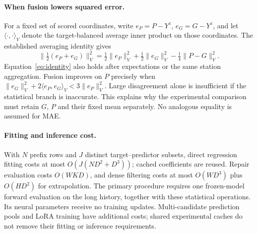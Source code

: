\paragraph{When fusion lowers squared error.}
For a fixed set of scored coordinates, write $e_P=P-Y^z$, $e_G=G-Y^z$, and let $\langle\cdot,\cdot\rangle_V$ denote the target-balanced average inner product on those coordinates. The established averaging identity gives
\begin{equation}
 \|\tfrac12(e_P+e_G)\|_V^2
 =\tfrac12\|e_P\|_V^2+\tfrac12\|e_G\|_V^2
 -\tfrac14\|P-G\|_V^2.
 \label{eq:identity}
\end{equation}
Equation~\ref{eq:identity} also holds after expectations or the same station aggregation. Fusion improves on $P$ precisely when $\|e_G\|_V^2+2\langle e_P,e_G\rangle_V<3\|e_P\|_V^2$. Large disagreement alone is insufficient if the statistical branch is inaccurate. This explains why the experimental comparison must retain $G$, $P$ and their fixed mean separately. No analogous equality is assumed for MAE.

\paragraph{Fitting and inference cost.}
With $N$ prefix rows and $J$ distinct target--predictor subsets, direct regression fitting costs at most $O(J(ND^2+D^3))$; cached coefficients are reused. Repair evaluation costs $O(WKD)$, and dense filtering costs at most $O(WD^3)$ plus $O(HD^2)$ for extrapolation. The primary procedure requires one frozen-model forward evaluation on the long history, together with these statistical operations. Its neural parameters receive no training updates. Multi-candidate prediction pools and LoRA training have additional costs; shared experimental caches do not remove their fitting or inference requirements.
